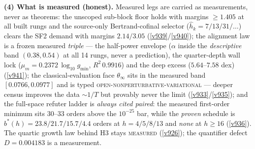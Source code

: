 \documentclass[11pt,a4paper]{article}
\begin{document}
\par\smallskip\noindent\textbf{(4) What is measured (honest).}  Measured legs are carried as
measurements, never as theorems: the unscoped sub-block floor holds with margins $\ge 1.405$ at
all built rungs and the source-only Bertrand-cofinal selector ($\hat h_k = 7/13/31/\ldots$)
clears the SF2 demand with margins $2.14/3.05$ (\vref{v939}/\vref{v940}); the alignment law is
a frozen measured \emph{triple} --- the half-power envelope ($\alpha$ inside the
\emph{descriptive} band $(0.38, 0.54)$ at all 14 rungs, never a prediction), the quarter-depth
wall lock ($\mu_m = 0.2372\,\log_{10} g_{\min}$, $R^2\,0.9916$) and the deep excess
($5.64$--$7.58$ dex) (\vref{v941}); the classical-evaluation face $\theta_\infty$ sits in the
measured band $[0.0766, 0.0977]$ and is typed \textsc{open-nonperturbative-variational} ---
deeper census improves the data ${\sim}1/T$ but provably never the limit
(\vref{v933}/\vref{v935}); and the full-space refuter ladder is \emph{always cited paired}: the
measured first-order minimum sits $30$--$33$ orders above the $10^{-25}$ bar, while the
\emph{proven} schedule is $b^*(h) = 23.8/21.7/15.7/4.4$ orders at $h = 4/5/8/13$ and \emph{none}
at $h \ge 16$ (\vref{v936}).  The quartic growth law behind H3 stays \textsc{measured}
(\vref{v926}); the quantifier defect $D = 0.004183$ is a measurement.
\end{document}
